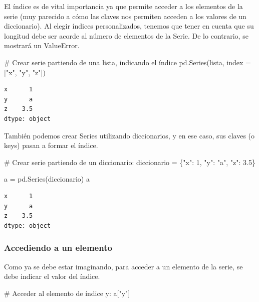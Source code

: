 \documentclass[
  letterpaper,
  DIV=11,
  numbers=noendperiod]{scrreprt}
\newenvironment{Shaded}{\begin{snugshade}}{\end{snugshade}}
\newcommand{\CommentTok}[1]{\textcolor[rgb]{0.37,0.37,0.37}{#1}}
\newcommand{\DecValTok}[1]{\textcolor[rgb]{0.68,0.00,0.00}{#1}}
\newcommand{\FloatTok}[1]{\textcolor[rgb]{0.68,0.00,0.00}{#1}}
\newcommand{\NormalTok}[1]{\textcolor[rgb]{0.00,0.23,0.31}{#1}}
\newcommand{\OperatorTok}[1]{\textcolor[rgb]{0.37,0.37,0.37}{#1}}
\newcommand{\StringTok}[1]{\textcolor[rgb]{0.13,0.47,0.30}{#1}}
\begin{document}
El índice es de vital importancia ya que permite acceder a los elementos
de la serie (muy parecido a cómo las claves nos permiten acceden a los
valores de un diccionario). Al elegir índices personalizados, tenemos
que tener en cuenta que su longitud debe ser acorde al número de
elementos de la Serie. De lo contrario, se mostrará un ValueError.

\begin{Shaded}
\begin{Highlighting}[]
\CommentTok{\# Crear serie partiendo de una lista, indicando el índice}
\NormalTok{pd.Series(lista, index }\OperatorTok{=}\NormalTok{ [}\StringTok{"x"}\NormalTok{, }\StringTok{"y"}\NormalTok{, }\StringTok{"z"}\NormalTok{])}
\end{Highlighting}
\end{Shaded}

\begin{verbatim}
x      1
y      a
z    3.5
dtype: object
\end{verbatim}

También podemos crear Series utilizando diccionarios, y en ese caso, sus
claves (o keys) pasan a formar el índice.

\begin{Shaded}
\begin{Highlighting}[]
\CommentTok{\# Crear serie partiendo de un diccionario:}
\NormalTok{diccionario }\OperatorTok{=}\NormalTok{ \{}\StringTok{"x"}\NormalTok{: }\DecValTok{1}\NormalTok{, }\StringTok{"y"}\NormalTok{: }\StringTok{"a"}\NormalTok{, }\StringTok{"z"}\NormalTok{: }\FloatTok{3.5}\NormalTok{\}}

\NormalTok{a }\OperatorTok{=}\NormalTok{ pd.Series(diccionario)}
\NormalTok{a}
\end{Highlighting}
\end{Shaded}

\begin{verbatim}
x      1
y      a
z    3.5
dtype: object
\end{verbatim}

\subsubsection{Accediendo a un elemento}\label{accediendo-a-un-elemento}

Como ya se debe estar imaginando, para acceder a un elemento de la
serie, se debe indicar el valor del índice.

\begin{Shaded}
\begin{Highlighting}[]
\CommentTok{\# Acceder al elemento de índice y:}
\NormalTok{a[}\StringTok{"y"}\NormalTok{]}
\end{Highlighting}
\end{Shaded}
\end{document}
